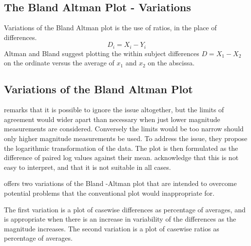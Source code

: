 \documentclass[Main.tex]{subfiles}
\begin{document}
	\subsection{The Bland Altman Plot - Variations}
	Variations of the Bland Altman plot is the use of ratios, in the
	place of differences.
	\begin{equation}
	D_{i} = X_{i} - Y_{i}   \label{BA01}
	\end{equation}
	Altman and Bland suggest plotting the within subject differences $
	D = X_{1} - X_{2} $ on the ordinate versus the average of $x_{1}$
	and  $x_{2}$ on the abscissa.
	
	
	\subsection{Variations of the Bland Altman Plot}
	\citet{BA99} remarks that it is possible to ignore the issue
	altogether, but the limits of agreement would wider apart than
	necessary when just lower magnitude measurements are considered.
	Conversely the limits would be too narrow should only higher
	magnitude measurements be used. To address the issue, they propose
	the logarithmic transformation of the data. The plot is then
	formulated as the difference of paired log values against their
	mean. \citet{BA99} acknowledge that this is not easy to interpret,
	and that it is not suitable in all cases.
	
	\citet{BA99} offers two variations of the Bland -Altman plot that
	are intended to overcome potential problems that the conventional
	plot would inappropriate for.
	
	The first variation is a plot of casewise differences as
	percentage of averages, and is appropriate when there is an
	increase in variability of the differences as the magnitude
	increases. The second variation is a plot of casewise ratios as
	percentage of averages.
	
	
	
	
	
	
	
\end{document}
